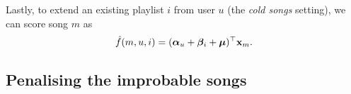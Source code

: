 Lastly, to extend an existing playlist $i$ from user $u$ (\ie the \emph{cold songs} setting),
we can score song $m$ as
$$
\hat f(m, u, i) = ({\bm{\alpha}}_u + {\bm{\beta}}_i + \bm{\mu})^\top \mathbf{x}_m.
$$




\subsection{Penalising the improbable songs}
\label{ssec:bploss}

